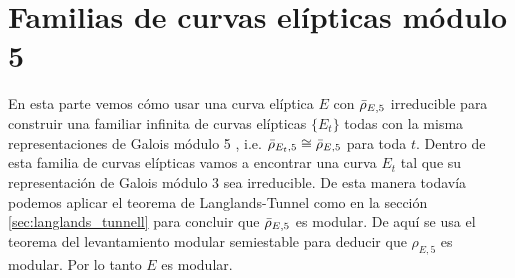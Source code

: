 \section{Familias de curvas elípticas módulo 5}

En esta parte vemos cómo usar una curva elíptica $E$ con $\bar{\rho}_{E,5}$ irreducible para construir una familiar infinita de curvas elípticas $\{E_t\}$ todas con la misma representaciones de Galois módulo 5 , i.e. $\bar{\rho}_{E_t,5}\cong\bar{\rho}_{E,5}$ para toda $t$. Dentro de esta familia de curvas elípticas vamos a encontrar una curva $E_t$ tal que su representación de Galois módulo 3 sea irreducible. De esta manera todavía podemos aplicar el teorema de Langlands-Tunnel como en la sección \ref{sec:langlands_tunnell} para concluir que $\bar{\rho}_{E,5}$ es modular. De aquí se usa el teorema del levantamiento modular semiestable para deducir que $\rho_{E,5}$ es modular. Por lo tanto $E$ es modular. 